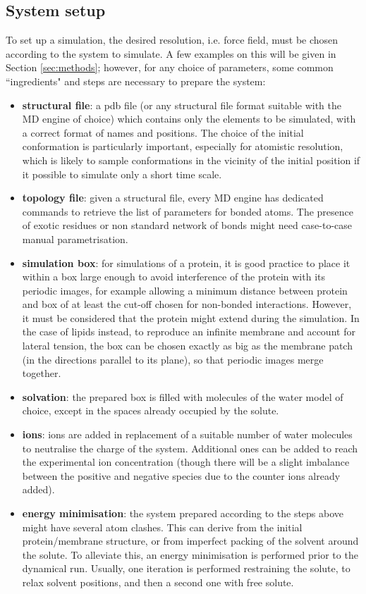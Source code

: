 \subsection{System setup}
To set up a simulation, the desired resolution, i.e. force field, must be chosen according to the system to simulate. A few examples on this will be given in Section \ref{sec:methods}; however, for any choice of parameters, some common ``ingredients" and steps are necessary to prepare the system:
\begin{itemize}
\item \textbf{structural file}: a pdb file (or any structural file format suitable with the MD engine of choice) which contains only the elements to be simulated, with a correct format of names and positions. The choice of the initial conformation is particularly important, especially for atomistic resolution, which is likely to sample conformations in the vicinity of the initial position if it possible to simulate only a short time scale.
\item \textbf{topology file}: given a structural file, every MD engine has dedicated commands to retrieve the list of parameters for bonded atoms. The presence of exotic residues or non standard network of bonds might need case-to-case manual parametrisation.
\item \textbf{simulation box}: for simulations of a protein, it is good practice to place it within a box large enough to avoid interference of the protein with its periodic images, for example allowing a minimum distance between protein and box of at least the cut-off chosen for non-bonded interactions. However, it must be considered that the protein might extend during the simulation. In the case of lipids instead, to reproduce an infinite membrane and account for lateral tension, the box can be chosen exactly as big as the membrane patch (in the directions parallel to its plane), so that periodic images merge together.
\item \textbf{solvation}: the prepared box is filled with molecules of the water model of choice, except in the spaces already occupied by the solute.
\item \textbf{ions}: ions are added in replacement of a suitable number of water molecules to neutralise the charge of the system. Additional ones can be added to reach the experimental ion concentration (though there will be a slight imbalance between the positive and negative species due to the counter ions already added).
\item \textbf{energy minimisation}: the system prepared according to the steps above might have several atom clashes. This can derive from the initial protein/membrane structure, or from imperfect packing of the solvent around the solute. To alleviate this, an energy minimisation is performed prior to the dynamical run. Usually, one iteration is performed restraining the solute, to relax solvent positions, and then a second one with free solute.

\end{itemize}
